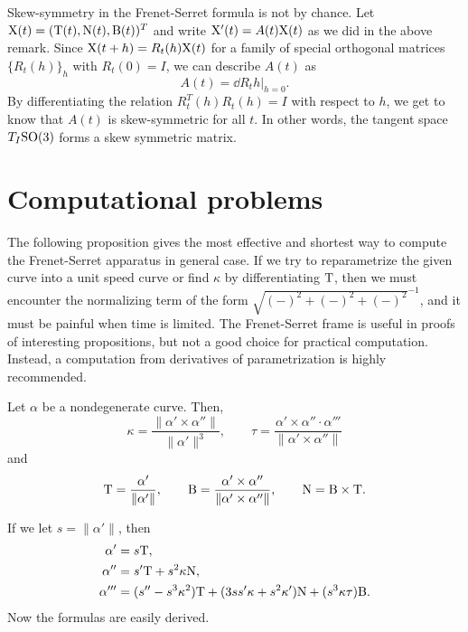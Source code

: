 \documentclass{../note}
\def\a{\alpha}
\begin{document}
\begin{rmk}
Skew-symmetry in the Frenet-Serret formula is not by chance.
Let $\mathrm{X}(t)=(\mathrm{T}(t),\mathrm{N}(t),\mathrm{B}(t))^T$ and write $\mathrm{X}'(t)=A(t)\mathrm{X}(t)$ as we did in the above remark.
Since $\mathrm{X}(t+h)=R_t(h)\mathrm{X}(t)$ for a family of special orthogonal matrices $\{R_t(h)\}_h$ with $R_t(0)=I$, we can describe $A(t)$ as 
\[A(t)=\left.\dd{R_t}{h}\right\rvert_{h=0}.\]
By differentiating the relation $R_t^T(h)R_t(h)=I$ with respect to $h$, we get to know that $A(t)$ is skew-symmetric for all $t$.
In other words, the tangent space $T_I\mathrm{SO}(3)$ forms a skew symmetric matrix.
\end{rmk}













\section{Computational problems}

The following proposition gives the most effective and shortest way to compute the Frenet-Serret apparatus in general case.
If we try to reparametrize the given curve into a unit speed curve or find $\kappa$ by differentiating $\mathrm{T}$, then we must encounter the normalizing term of the form $\sqrt{(-)^2+(-)^2+(-)^2}^{-1}$, and it must be painful when time is limited.
The Frenet-Serret frame is useful in proofs of interesting propositions, but not a good choice for practical computation.
Instead, a computation from derivatives of parametrization is highly recommended.
\begin{prop}
Let $\a$ be a nondegenerate curve.
Then,
\[\kappa=\frac{\|\a'\times\a''\|}{\|\a'\|^3},\qquad\tau=\frac{\a'\times\a''\cdot\a'''}{\|\a'\times\a''\|}\]
and
\[\rT=\frac{\a'}{\|\a'\|},\qquad\rB=\frac{\a'\times\a''}{\|\a'\times\a''\|},\qquad\rN=\rB\times\rT.\]
\end{prop}
\begin{pf}
If we let $s=\|\a'\|$, then
\begin{align*}
\a'&=s\rT,\\
\a''&=s'\rT+s^2\kappa\rN,\\
\a'''&=(s''-s^3\kappa^2)\rT+(3ss'\kappa+s^2\kappa')\rN+(s^3\kappa\tau)\rB.
\end{align*}
Now the formulas are easily derived.
\end{pf}
\end{document}

